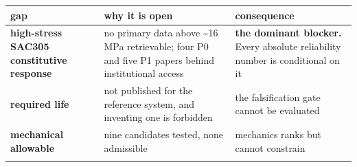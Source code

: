 \documentclass[10pt,]{article}
\begin{document}
\begin{longtable}[]{@{}lll@{}}
\toprule
\begin{minipage}[b]{0.30\columnwidth}\raggedright
gap\strut
\end{minipage} & \begin{minipage}[b]{0.30\columnwidth}\raggedright
why it is open\strut
\end{minipage} & \begin{minipage}[b]{0.30\columnwidth}\raggedright
consequence\strut
\end{minipage}\tabularnewline
\midrule
\endhead
\begin{minipage}[t]{0.30\columnwidth}\raggedright
\textbf{high-stress SAC305 constitutive response}\strut
\end{minipage} & \begin{minipage}[t]{0.30\columnwidth}\raggedright
no primary data above \textasciitilde{}16 MPa retrievable; four P0 and
five P1 papers behind institutional access\strut
\end{minipage} & \begin{minipage}[t]{0.30\columnwidth}\raggedright
\textbf{the dominant blocker.} Every absolute reliability number is
conditional on it\strut
\end{minipage}\tabularnewline
\begin{minipage}[t]{0.30\columnwidth}\raggedright
\textbf{required life}\strut
\end{minipage} & \begin{minipage}[t]{0.30\columnwidth}\raggedright
not published for the reference system, and inventing one is
forbidden\strut
\end{minipage} & \begin{minipage}[t]{0.30\columnwidth}\raggedright
the falsification gate cannot be evaluated\strut
\end{minipage}\tabularnewline
\begin{minipage}[t]{0.30\columnwidth}\raggedright
\textbf{mechanical allowable}\strut
\end{minipage} & \begin{minipage}[t]{0.30\columnwidth}\raggedright
nine candidates tested, none admissible\strut
\end{minipage} & \begin{minipage}[t]{0.30\columnwidth}\raggedright
mechanics ranks but cannot constrain\strut
\end{minipage}\tabularnewline
\begin{minipage}[t]{0.30\columnwidth}\raggedright

\end{minipage}
\end{longtable}
\end{document}
